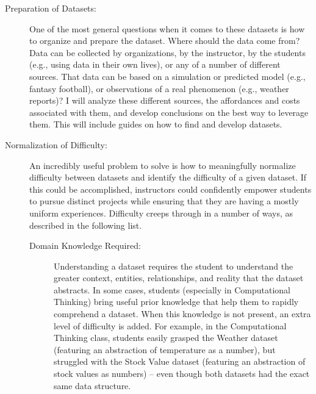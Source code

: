 \begin{description}
  \item[Preparation of Datasets:] One of the most general questions when it comes to these datasets is how to organize and prepare the dataset. Where should the data come from? Data can be collected by organizations, by the instructor, by the students (e.g., using data in their own lives), or any of a number of different sources. That data can be based on a simulation or predicted model (e.g., fantasy football), or observations of a real phenomenon (e.g., weather reports)? I will analyze these different sources, the affordances and costs associated with them, and develop conclusions on the best way to leverage them. This will include guides on how to find and develop datasets.
	\item[Normalization of Difficulty:] An incredibly useful problem to solve is how to meaningfully normalize difficulty between datasets and identify the difficulty of a given dataset. If this could be accomplished, instructors could confidently empower students to pursue distinct projects while ensuring that they are having a mostly uniform experiences. Difficulty creeps through in a number of ways, as described in the following list. \begin{description}
	  \item[Domain Knowledge Required:] Understanding a dataset requires the student to understand the greater context, entities, relationships, and reality that the dataset abstracts. In some cases, students (especially in Computational Thinking) bring useful prior knowledge that help them to rapidly comprehend a dataset. When this knowledge is not present, an extra level of difficulty is added. For example, in the Computational Thinking class, students easily grasped the Weather dataset (featuring an abstraction of temperature as a number), but struggled with the Stock Value dataset (featuring an abstraction of stock values as numbers) -- even though both datasets had the exact same data structure.
		

\end{description}
\end{description}
